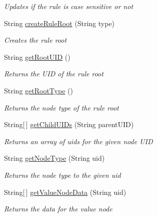 \begin{DoxyCompactItemize}
\begin{DoxyCompactList}\small\item\em Updates if the rule is case sensitive or not \end{DoxyCompactList}\item 
String \hyperlink{class_web_analyzer_1_1_u_i_1_1_interaction_objects_1_1_rule_control_a27dad22845932db3e98f3e9029ba5920}{create\+Rule\+Root} (String type)
\begin{DoxyCompactList}\small\item\em Creates the rule root \end{DoxyCompactList}\item 
String \hyperlink{class_web_analyzer_1_1_u_i_1_1_interaction_objects_1_1_rule_control_ace7f35f8f3444a5e832e0d2164b41f58}{get\+Root\+U\+I\+D} ()
\begin{DoxyCompactList}\small\item\em Returns the U\+I\+D of the rule root \end{DoxyCompactList}\item 
String \hyperlink{class_web_analyzer_1_1_u_i_1_1_interaction_objects_1_1_rule_control_a995a79af866a4015dbdea7641eb45717}{get\+Root\+Type} ()
\begin{DoxyCompactList}\small\item\em Returns the node type of the rule root \end{DoxyCompactList}\item 
String\mbox{[}$\,$\mbox{]} \hyperlink{class_web_analyzer_1_1_u_i_1_1_interaction_objects_1_1_rule_control_a2a6e2b40f8c2b2c7be49eaa51eebf71b}{get\+Child\+U\+I\+Ds} (String parent\+U\+I\+D)
\begin{DoxyCompactList}\small\item\em Returns an array of uids for the given node U\+I\+D \end{DoxyCompactList}\item 
String \hyperlink{class_web_analyzer_1_1_u_i_1_1_interaction_objects_1_1_rule_control_a50c02465d6ffa924e089e567598305f4}{get\+Node\+Type} (String uid)
\begin{DoxyCompactList}\small\item\em Returns the node type to the given uid \end{DoxyCompactList}\item 
String\mbox{[}$\,$\mbox{]} \hyperlink{class_web_analyzer_1_1_u_i_1_1_interaction_objects_1_1_rule_control_ae9ceeb3481aba63c3157304bf2f0965e}{get\+Value\+Node\+Data} (String uid)
\begin{DoxyCompactList}\small\item\em Returns the data for the value node \end{DoxyCompactList}\item 

\end{DoxyCompactItemize}

